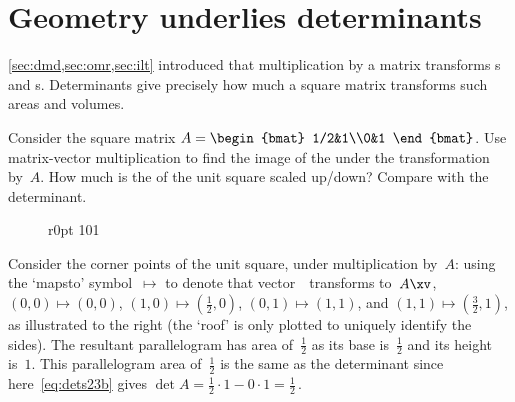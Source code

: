 
\section{Geometry underlies determinants}
\label{sec:gud}



\begin{comment}
Develop {determinant}s from a geometric basis to most quickly get critical results.
This geometric approach ``encourages students to engage in what Blum and Kirsch call preformal proving'' \cite[p.401]{Hannah96}.
\end{comment}

\cref{sec:dmd,sec:omr,sec:ilt} introduced that multiplication by a matrix transforms s and s.
Determinants give precisely how much a square matrix transforms such areas and volumes.

\begin{example} \label{eg:detarea1}
Consider the square matrix \(A=\begin{bmat} 1/2&1\\0&1 \end{bmat}\).
Use matrix-vector multiplication to find the image of the  under the transformation by~\(A\).
How much is the  of the unit square scaled up/down?  
Compare with the determinant.

\begin{solution} 
\begin{wrapfigure}[5]r{0pt} 101 \end{wrapfigure}
Consider the corner points of the unit square, under multiplication by~\(A\): 
using the `{mapsto}' symbol~\index{$\mapsto$}$\mapsto$ to denote that vector~\xv\ transforms to~\(A\xv\), \((0,0)\mapsto(0,0)\), \((1,0)\mapsto(\frac12,0)\), \((0,1)\mapsto(1,1)\), and \((1,1)\mapsto(\frac32,1)\), as illustrated to the right  
(the `roof' is only plotted to uniquely identify the sides).
The resultant parallelogram has area of~\(\frac12\) as its base is~\(\frac12\) and its height is~\(1\).
This parallelogram area of~\(\tfrac12\) is the same as the determinant since here~\eqref{eq:dets23b} gives \(\det A=\frac12\cdot1-0\cdot1=\frac12\)\,. 
\aqed

\end{solution}
\end{example}


